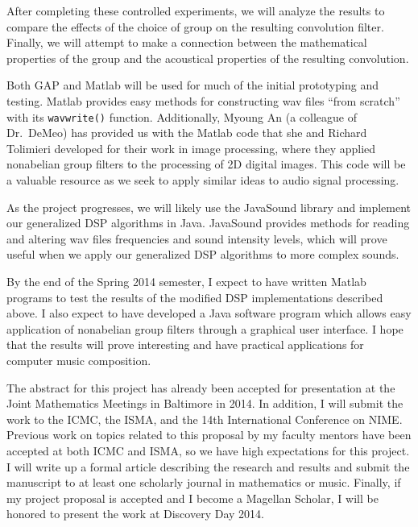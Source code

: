 \documentclass[11pt]{article}
\begin{document}
After completing these controlled experiments, we will analyze the results to
compare the effects of the choice of group on the resulting convolution filter.
Finally, we will attempt to make a connection between the mathematical
properties of the group and the acoustical properties of the resulting
convolution.  

Both \acs{GAP} and Matlab will be used for much of the initial prototyping and
testing. Matlab provides easy methods for constructing wav files ``from 
scratch'' with its {\tt wavwrite()} function. Additionally, Myoung An (a colleague of
Dr.~DeMeo) has provided us with the Matlab code that she and Richard Tolimieri
developed for their work in image processing, where they applied nonabelian group
filters to the processing of 2D digital images. This code will be a valuable
resource as we seek to apply similar ideas to audio signal processing.  

As the project progresses, we will likely use the JavaSound library and
implement our generalized \ac{DSP} algorithms in Java.  JavaSound provides methods
for reading and altering wav files frequencies and sound intensity levels, which
will prove useful when we apply our generalized \ac{DSP} algorithms to more complex
sounds.

\vskip5mm


By the end of the Spring 2014 semester, I expect to have written Matlab programs
to test the results of the modified \ac{DSP} implementations described above.  I also
expect to have developed a Java software program which allows easy application
of nonabelian group filters through a graphical user interface.  I hope that the
results will prove interesting and have practical applications for computer
music composition.  

The abstract for this project has already been accepted for presentation at the
Joint Mathematics Meetings in Baltimore in 2014.  In addition, I will submit the
work to the \ac{ICMC}, the \ac{ISMA}, and the 14th International
Conference on \ac{NIME}. Previous work on
topics related to this proposal by my faculty mentors have been accepted at both
ICMC and ISMA,
 so we have high expectations for this project. I will write up a formal article 
describing the research and results and submit the manuscript to at least
one scholarly journal in mathematics or music. Finally, if my project proposal
is accepted and I become a Magellan Scholar, I will be honored to present the
work at Discovery Day 2014.   
\end{document}
